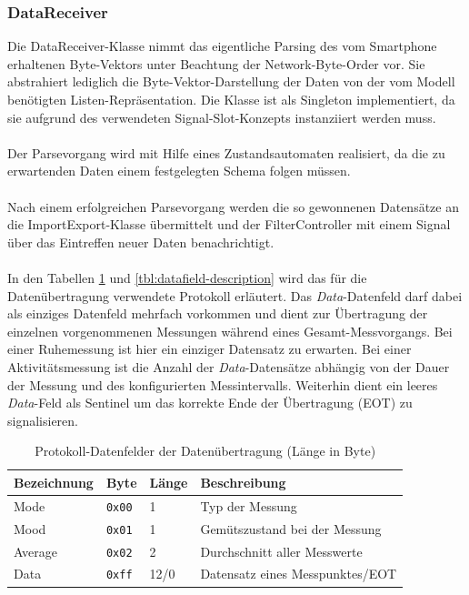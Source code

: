 \subsubsection{DataReceiver}
Die DataReceiver-Klasse nimmt das eigentliche Parsing des vom Smartphone erhaltenen Byte-Vektors unter Beachtung der Network-Byte-Order vor. Sie abstrahiert lediglich die Byte-Vektor-Darstellung der Daten von der vom Modell benötigten Listen-Repräsentation. Die Klasse ist als Singleton implementiert, da sie aufgrund des verwendeten Signal-Slot-Konzepts instanziiert werden muss.\\
\\
Der Parsevorgang wird mit Hilfe eines Zustandsautomaten realisiert, da die zu erwartenden Daten einem festgelegten Schema folgen müssen.\\
\\
Nach einem erfolgreichen Parsevorgang werden die so gewonnenen Datensätze an die ImportExport-Klasse übermittelt und der FilterController mit einem Signal über das Eintreffen neuer Daten benachrichtigt.\\
\\
In den Tabellen \ref{tbl:pdu} und \ref{tbl:datafield-description} wird das für die Datenübertragung verwendete Protokoll erläutert. Das \textit{Data}-Datenfeld darf dabei als einziges Datenfeld mehrfach vorkommen und dient zur Übertragung der einzelnen vorgenommenen Messungen während eines Gesamt-Messvorgangs. Bei einer Ruhemessung ist hier ein einziger Datensatz zu erwarten. Bei einer Aktivitätsmessung ist die Anzahl der \textit{Data}-Datensätze abhängig von der Dauer der Messung und des konfigurierten Messintervalls. Weiterhin dient ein leeres \textit{Data}-Feld als Sentinel um das korrekte Ende der Übertragung (EOT) zu signalisieren.
\begin{table}[h]
	\centering
		\begin{tabularx}{\textwidth}{l|l|l|X}
			\hline
			Bezeichnung & Byte & Länge & Beschreibung \\
			\hline
			\hline
			Mode & \texttt{0x00} & 1 & Typ der Messung\\
			\hline
			Mood & \texttt{0x01} & 1 & Gemütszustand bei der Messung\\
			\hline
			Average & \texttt{0x02} & 2 & Durchschnitt aller Messwerte\\
			\hline
			Data & \texttt{0xff} & 12/0 & Datensatz eines Messpunktes/EOT\\
			\hline
		\end{tabularx}
		\caption{Protokoll-Datenfelder der Datenübertragung (Länge in Byte)}
		\label{tbl:pdu}
\end{table}

